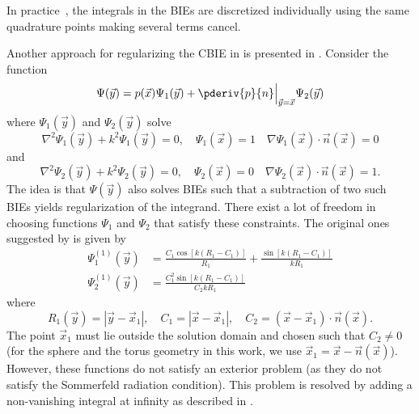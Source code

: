 In practice~\cite{Scott2013ibe}, the integrals in the BIEs are discretized individually using the same quadrature points making several terms cancel.

Another approach for regularizing the CBIE in  is presented in \cite{Sun2015bri}. Consider the function
\begin{equation*}
	\Psi(\vec{y}) = p(\vec{x})\Psi_1(\vec{y}) + \pderiv{p}{n}\Big\vert_{\vec{y}=\vec{x}}\Psi_2(\vec{y})
\end{equation*}
where $\Psi_1(\vec{y})$ and $\Psi_2(\vec{y})$ solve
\begin{equation*}
	\nabla^2\Psi_1(\vec{y}) + k^2\Psi_1(\vec{y}) = 0,\quad \Psi_1(\vec{x})= 1\quad \nabla\Psi_1(\vec{x})\cdot \vec{n}(\vec{x}) = 0
\end{equation*}
and
\begin{equation*}
	\nabla^2\Psi_2(\vec{y}) + k^2\Psi_2(\vec{y}) = 0,\quad \Psi_2(\vec{x})= 0\quad \nabla\Psi_2(\vec{x})\cdot \vec{n}(\vec{x}) = 1.
\end{equation*}
The idea is that $\Psi(\vec{y})$ also solves BIEs such that a subtraction of two such BIEs yields regularization of the integrand. There exist a lot of freedom in choosing functions $\Psi_1$ and $\Psi_2$ that satisfy these constraints. The original ones suggested by \cite{Sun2015bri} is given by
\begin{equation}\label{Eq3:psi_12_1}
\begin{aligned}
	\Psi_1^{(1)}(\vec{y}) &= \frac{C_1\cos[k(R_1-C_1)]}{R_1} + \frac{\sin[k(R_1-C_1)]}{kR_1}\\
	\Psi_2^{(1)}(\vec{y}) &= \frac{C_1^2\sin[k(R_1-C_1)]}{C_2kR_1}
\end{aligned}
\end{equation}
where
\begin{equation*}
	R_1(\vec{y}) = |\vec{y}-\vec{x}_1|, \quad C_1 = |\vec{x}-\vec{x}_1|,\quad C_2 = (\vec{x}-\vec{x}_1)\cdot\vec{n}(\vec{x}).
\end{equation*}
The point $\vec{x}_1$ must lie outside the solution domain and chosen such that $C_2\neq 0$ (for the sphere and the torus geometry in this work, we use $\vec{x}_1=\vec{x} - \vec{n}(\vec{x})$). However, these functions do not satisfy an exterior problem (as they do not satisfy the Sommerfeld radiation condition). This problem is resolved by adding a non-vanishing integral at infinity as described in \cite{Sun2015bri}.

